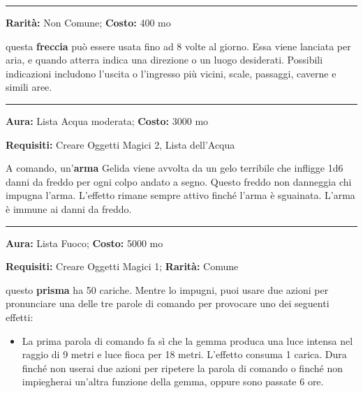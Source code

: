 \begin{multicols}{2}
\smallskip\noindent\rule{\linewidth}{2pt}  \hypertarget{Freccialocalizzante}{}\smallskip{}\noindent\label{Freccialocalizzante}

\textbf{Rarità:} Non Comune; \textbf{Costo:} 400 mo

questa \textbf{freccia} può essere usata fino ad 8 volte al giorno. Essa viene lanciata per aria, e quando atterra indica una direzione o un luogo desiderati. Possibili indicazioni includono l'uscita o l'ingresso più vicini, scale, passaggi, caverne e simili aree.

\smallskip\noindent\rule{\linewidth}{2pt}  \hypertarget{Gelida}{}\smallskip{}\noindent\label{Gelida}

\textbf{Aura:} Lista Acqua moderata; \textbf{Costo:} 3000 mo

\textbf{Requisiti:} Creare Oggetti Magici 2, Lista dell'Acqua

A comando, un'\textbf{arma} Gelida viene avvolta da un gelo terribile che infligge 1d6 danni da freddo per ogni colpo andato a segno. Questo freddo non danneggia chi impugna l'arma. L'effetto rimane sempre attivo finché l'arma è sguainata. L'arma è immune ai danni da freddo.

\smallskip\noindent\rule{\linewidth}{2pt}  \hypertarget{GemmadellaLuminosità}{}\smallskip{}\noindent\label{GemmadellaLuminosità}

\textbf{Aura:} Lista Fuoco; \textbf{Costo:} 5000 mo

\textbf{Requisiti:} Creare Oggetti Magici 1; \textbf{Rarità:} Comune

questo \textbf{prisma} ha 50 cariche. Mentre lo impugni, puoi usare due azioni per pronunciare una delle tre parole di comando per provocare uno dei seguenti effetti:

\begin{itemize}[leftmargin=*] \setlength{\itemsep}{0pt}
\item
La prima parola di comando fa sì che la gemma produca una luce intensa nel raggio di 9 metri e luce fioca per 18 metri. L'effetto consuma 1 carica. Dura finché non userai due azioni per ripetere la parola di comando o finché non impiegherai un'altra funzione della gemma, oppure sono passate 6 ore.


\end{itemize}
\end{multicols}
